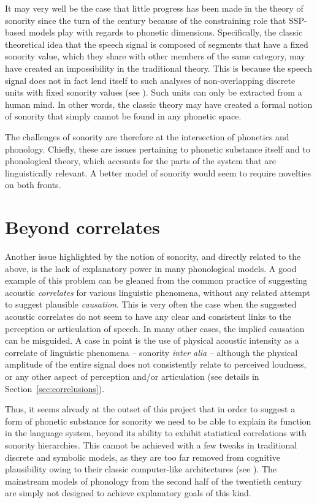 It may very well be the case that little progress has been made in the theory of sonority since the turn of the century because of the constraining role that SSP-based models play with regards to phonetic dimensions. Specifically, the classic theoretical idea that the speech signal is composed of segments that have a fixed sonority value, which they share with other members of the same category, may have created an impossibility in the traditional theory. This is because the speech signal does not in fact lend itself to such analyses of non-overlapping discrete units with fixed sonority values (see ). Such units can only be extracted from a human mind. In other words, the classic theory may have created a formal notion of sonority that simply cannot be found in any phonetic space.

The challenges of sonority are therefore at the intersection of phonetics and phonology.
Chiefly, these are issues pertaining to phonetic substance itself and to phonological theory, which accounts for the parts of the system that are linguistically relevant.
A better model of sonority would seem to require novelties on both fronts.

\section{Beyond correlates}\label{beyond-correlates}

Another issue highlighted by the notion of sonority, and directly related to the above, is the lack of explanatory power in many phonological models.
A good example of this problem can be gleaned from the common practice of suggesting acoustic \emph{correlates} for various linguistic phenomena, without any related attempt to suggest plausible \emph{causation}. This is very often the case when the suggested acoustic correlates do not seem to have any clear and consistent links to the perception or articulation of speech.
In many other cases, the implied causation can be misguided.
A case in point is the use of physical acoustic intensity as a correlate of linguistic phenomena -- sonority \emph{inter alia} -- although the physical amplitude of the entire signal does not consistently relate to perceived loudness, or any other aspect of perception and/or articulation (see details in Section~\ref{sec:correlusions}).

Thus, it seems already at the outset of this project that in order to suggest a form of phonetic substance for sonority we need to be able to explain its function in the language system, beyond its ability to exhibit statistical correlations with sonority hierarchies. This cannot be achieved with a few tweaks in traditional discrete and symbolic models, as they are too far removed from cognitive plausibility owing to their classic computer-like architectures (see ).
The mainstream models of phonology from the second half of the twentieth century are simply not designed to achieve explanatory goals of this kind.

